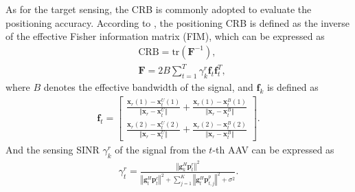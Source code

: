 \documentclass[twocolumn,journal]{IEEEtran}
\begin{document}
As for the target sensing, the CRB is commonly adopted to evaluate the positioning accuracy. According to \cite{huCollaborative2025}, the positioning CRB is defined as the inverse of the effective Fisher information matrix (FIM), which can be expressed as 
\begin{align}
    &\text{CRB} = \text{tr}(\mathbf{F}^{-1}),\\
    &\mathbf{F} = 2B\sum_{t=1}^{T} \gamma_{k}^{r}\boldsymbol{f}_{t}\boldsymbol{f}^{T}_{t},
\end{align}
where \(B\) denotes the effective bandwidth of the signal, and \(\boldsymbol{f}_{k}\) is defined as
\begin{align}
    \boldsymbol{f}_{t} = 
    \begin{bmatrix}
    \left.\frac{\boldsymbol{x}_{r}(1) - \boldsymbol{x}^U_{t}(1)}{\Vert \boldsymbol{x}_{r} - \boldsymbol{x}^U_{t} \Vert} + \frac{\boldsymbol{x}_{r}(1) - \boldsymbol{x}^B_{t}(1)}{\Vert \boldsymbol{x}_{r} - \boldsymbol{x}^B_{t} \Vert}\right.\\
    \left.\frac{\boldsymbol{x}_{r}(2) - \boldsymbol{x}^U_{t}(2)}{\Vert \boldsymbol{x}_{r} - \boldsymbol{x}^U_{t} \Vert} + \frac{\boldsymbol{x}_{r}(2) - \boldsymbol{x}^B_{t}(2)}{\Vert \boldsymbol{x}_{r} - \boldsymbol{x}^B_{t} \Vert}\right.
    \end{bmatrix}.
\end{align}
And the sensing SINR \(\gamma_{k}^{r}\) of the signal from the \(t\)-th AAV can be expressed as
\begin{align}
    \gamma_{t}^{r} = \frac{\left\Vert \boldsymbol{g}^{H}_{k}\boldsymbol{p}^{r}_{t} \right\Vert^2}{\left\Vert \boldsymbol{g}^{H}_{t}\boldsymbol{p}^{c}_{t} \right\Vert^2 + \sum_{j=1}^{K}\left\Vert \boldsymbol{g}^{H}_{t}\boldsymbol{p}^{p}_{t,j} \right\Vert^2 + \sigma^2}.\label{eq:SINRr}
\end{align}
\end{document}
